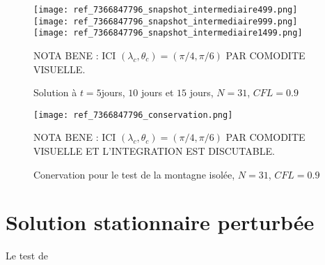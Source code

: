 \begin{figure}
\begin{center}
\texttt{[image: ref\_7366847796\_snapshot\_intermediaire499.png]}\\
\texttt{[image: ref\_7366847796\_snapshot\_intermediaire999.png]}\\
\texttt{[image: ref\_7366847796\_snapshot\_intermediaire1499.png]}
\end{center}
\caption{Solution à $t=5$jours, $10$ jours et $15$ jours, $N=31$, $CFL=0.9$}
\begin{com}
NOTA BENE : ICI $(\lambda_c, \theta_c)=(\pi/4, \pi/6)$ PAR COMODITE VISUELLE.
\end{com}
\label{Williamson 5 - visuel} 
\end{figure}

\begin{figure}
\begin{center}
\texttt{[image: ref\_7366847796\_conservation.png]}\\
\end{center}
\caption{Conervation pour le test de la montagne isolée, $N=31$, $CFL=0.9$}
\begin{com}
NOTA BENE : ICI $(\lambda_c, \theta_c)=(\pi/4, \pi/6)$ PAR COMODITE VISUELLE ET L'INTEGRATION EST DISCUTABLE.
\end{com}
\label{Williamson 5 - conservation}
\end{figure}

\section{Solution stationnaire perturbée}

Le test de \cite{Galewsky2004}